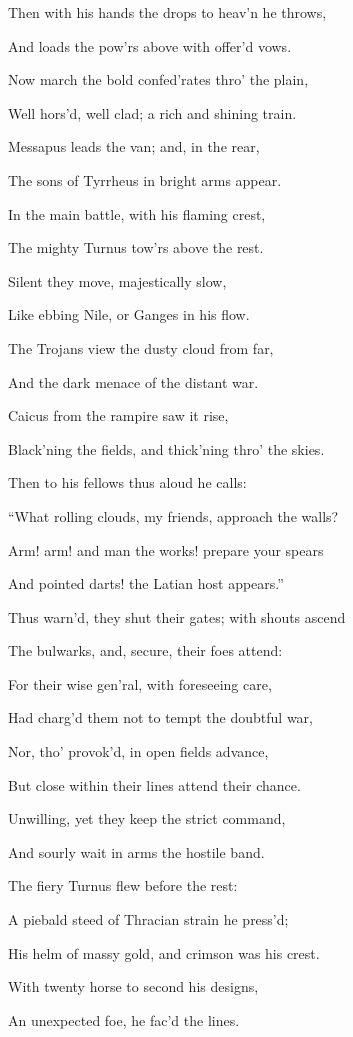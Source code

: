 Then with his hands the drops to heav’n he throws,

And loads the pow’rs above with offer’d vows.

Now march the bold confed’rates thro’ the plain,

Well hors’d, well clad; a rich and shining train.

Messapus leads the van; and, in the rear,

The sons of Tyrrheus in bright arms appear.

In the main battle, with his flaming crest,

The mighty Turnus tow’rs above the rest.

Silent they move, majestically slow,

Like ebbing Nile, or Ganges in his flow.

The Trojans view the dusty cloud from far,

And the dark menace of the distant war.

Caicus from the rampire saw it rise,

Black’ning the fields, and thick’ning thro’ the skies.

Then to his fellows thus aloud he calls:

“What rolling clouds, my friends, approach the walls?

Arm! arm! and man the works! prepare your spears

And pointed darts! the Latian host appears.”

Thus warn’d, they shut their gates; with shouts ascend

The bulwarks, and, secure, their foes attend:

For their wise gen’ral, with foreseeing care,

Had charg’d them not to tempt the doubtful war,

Nor, tho’ provok’d, in open fields advance,

But close within their lines attend their chance.

Unwilling, yet they keep the strict command,

And sourly wait in arms the hostile band.

The fiery Turnus flew before the rest:

A piebald steed of Thracian strain he press’d;

His helm of massy gold, and crimson was his crest.

With twenty horse to second his designs,

An unexpected foe, he fac’d the lines.

